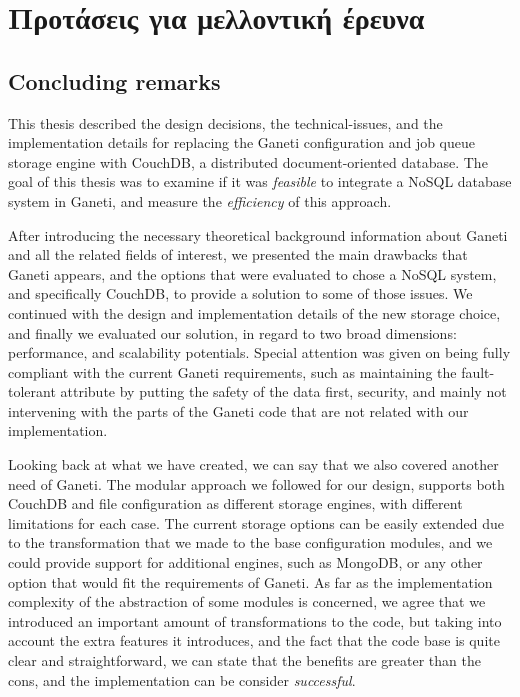 \chapter{Προτάσεις για μελλοντική έρευνα}\label{ch:conclusion}

\section{Concluding remarks}\label{sec:remarks}

This thesis described the design decisions, the technical-issues, and the
implementation details for replacing the Ganeti configuration and job queue
storage engine with CouchDB, a distributed document-oriented database. The goal
of this thesis was to examine if it was \emph{feasible} to integrate a NoSQL
database system in Ganeti, and measure the \emph{efficiency} of this approach.

After introducing the necessary theoretical background information about
Ganeti and all the related fields of interest, we presented the main drawbacks
that Ganeti appears, and the options that were evaluated to chose a NoSQL
system, and specifically CouchDB, to provide a solution to some of those issues.
We continued with the design and implementation details of the new storage
choice, and finally we evaluated our solution, in regard to two broad
dimensions: performance, and scalability potentials. Special attention was given
on being fully compliant with the current Ganeti requirements, such as
maintaining the fault-tolerant attribute by putting the safety of the data
first, security, and mainly not intervening with the parts of the Ganeti code
that are not related with our implementation.

Looking back at what we have created, we can say that we also covered another
need of Ganeti. The modular approach we followed for our design, supports both
CouchDB and file configuration as different storage engines, with different
limitations for each case. The current storage options can be easily extended
due to the transformation that we made to the base configuration modules, and we
could provide support for additional engines, such as MongoDB, or any other
option that would fit the requirements of Ganeti. As far as the implementation
complexity of the abstraction of some modules is concerned, we agree that we
introduced an important amount of transformations to the code, but taking into
account the extra features it introduces, and the fact that the code base is
quite clear and straightforward, we can state that the benefits are greater than
the cons, and the implementation can be consider \emph{successful}.

